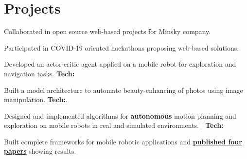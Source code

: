 \documentclass[]{resume-openfont}
\begin{document}
\begin{minipage}[t]{0.95\linewidth}

\section{Projects}
\begin{tightemize}
    \item Collaborated in open source web-based projects for Minsky company.
    \item Participated in COVID-19 oriented hackathons proposing web-based solutions.
\end{tightemize}

\begin{tightemize}
    \item Developed an actor-critic agent applied on a mobile robot for exploration and navigation tasks. \textbf{Tech:}   
\end{tightemize}

\begin{tightemize}
    \item Built a model architecture to automate beauty-enhancing of photos using image manipulation. \textbf{Tech:}.
\end{tightemize}
\begin{tightemize}
    \item Designed and implemented algorithms for \textbf{autonomous} motion planning and exploration on mobile robots in real and simulated environments. | \textbf{Tech:} 
    \item Built complete frameworks for mobile robotic applications and \href{https://scholar.google.com/citations?user=KjixlLsAAAAJ&hl=es&oi=ao}{\textbf{published four papers}} showing results. 
\end{tightemize}



\end{minipage}
\end{document}
